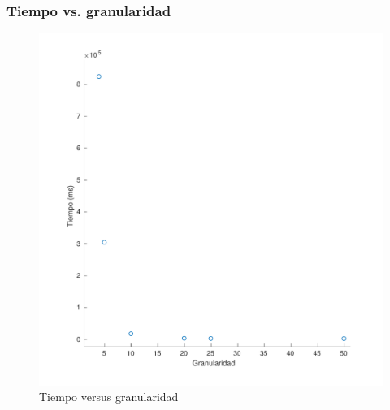 \documentclass[11pt]{beamer}
\begin{document}
\begin{frame}
\frametitle{Tiempo vs. granularidad}
\begin{figure}[H]
    \centering
        
            \includegraphics[scale=0.45]{img/granu_tiempo-eps-converted-to.pdf}
            \caption{Tiempo versus granularidad}
            \label{fig:tiempo versus granularidad}
        
    \end{figure}
\end{frame}
\end{document}

